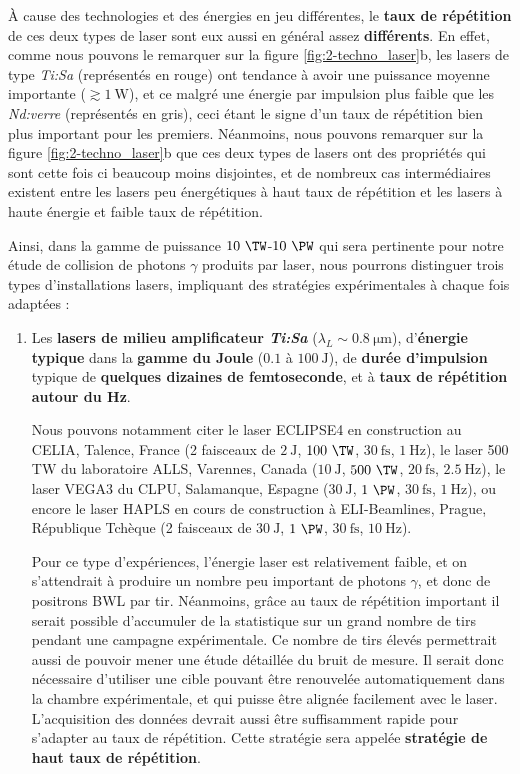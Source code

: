 \begin{refsection}
À cause des technologies et des énergies en jeu différentes, le \textbf{taux de répétition} de ces deux types de laser sont eux aussi en général assez \textbf{différents}. En effet, comme nous pouvons le remarquer sur la figure \ref{fig:2-techno_laser}b, les lasers de type \textit{Ti:Sa} (représentés en rouge) ont tendance à avoir une puissance moyenne importante ($\gtrsim 1 ~ \si{\W}$), et ce malgré une énergie par impulsion plus faible que les \textit{Nd:verre} (représentés en gris), ceci étant le signe d'un taux de répétition bien plus important pour les premiers. Néanmoins, nous pouvons remarquer sur la figure \ref{fig:2-techno_laser}b que ces deux types de lasers ont des propriétés qui sont cette fois ci beaucoup moins disjointes, et de nombreux cas intermédiaires existent entre les lasers peu énergétiques à haut taux de répétition et les lasers à haute énergie et faible taux de répétition.

Ainsi, dans la gamme de puissance $10 ~ \si{\TW}$-$10~ \si{\PW}$ qui sera pertinente pour notre étude de collision de photons $\gamma$ produits par laser, nous pourrons distinguer trois types d'installations lasers, impliquant des stratégies expérimentales à chaque fois adaptées :

\begin{enumerate}
\item 
    Les \textbf{lasers de milieu amplificateur \textit{Ti:Sa}} ($\lambda_L \sim 0.8~ \si{\um}$), d'\textbf{énergie typique} dans la \textbf{gamme du Joule} ($0.1$ à $100 ~ \si{\J}$), de \textbf{durée d'impulsion} typique de \textbf{quelques dizaines de femtoseconde}, et à \textbf{taux de répétition autour du Hz}.

    Nous pouvons notamment citer le laser ECLIPSE4 en construction au CELIA, Talence, France (2 faisceaux de $2 ~ \si{\J}$, $100 ~ \si{\TW}$, $30 ~ \si{\fs}$, $1 ~ \si{\Hz}$), le laser 500 TW \parencite{laser_500tw} du laboratoire ALLS, Varennes, Canada ($10 ~ \si{\J}$, $500 ~ \si{\TW}$, $20 ~ \si{\fs}$, $2.5 ~ \si{\Hz}$), le laser VEGA3 \parencite{laser_vega} du CLPU, Salamanque, Espagne ($30 ~ \si{\J}$, $1 ~ \si{\PW}$, $30 ~ \si{\fs}$, $1 ~ \si{\Hz}$), ou encore le laser HAPLS \parencite{laser_hapls} en cours de construction à ELI-Beamlines, Prague, République Tchèque (2 faisceaux de $30~ \si{\J}$, $1 ~ \si{\PW}$, $30 ~ \si{\fs}$, $10 ~ \si{\Hz}$).

    Pour ce type d'expériences, l'énergie laser est relativement faible, et on s'attendrait à produire un nombre peu important de photons $\gamma$, et donc de positrons BWL par tir. Néanmoins, grâce au taux de répétition important il serait possible d'accumuler de la statistique sur un grand nombre de tirs pendant une campagne expérimentale. Ce nombre de tirs élevés permettrait aussi de pouvoir mener une étude détaillée du bruit de mesure. Il serait donc nécessaire d'utiliser une cible pouvant être renouvelée automatiquement dans la chambre expérimentale, et qui puisse être alignée facilement avec le laser. L'acquisition des données devrait aussi être suffisamment rapide pour s'adapter au taux de répétition. Cette stratégie sera appelée \textbf{stratégie de haut taux de répétition}.
  

\end{enumerate}
\end{refsection}

